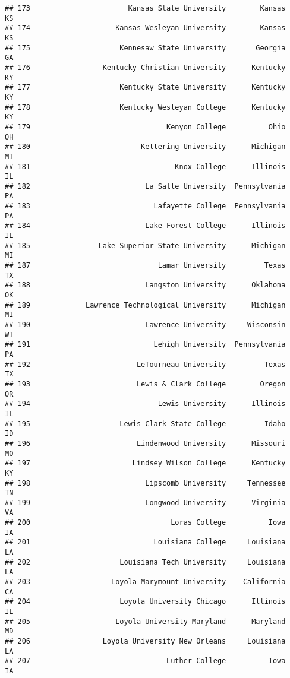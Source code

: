 \documentclass[
]{article}
\begin{document}
\begin{verbatim}
## 173                       Kansas State University        Kansas         KS
## 174                    Kansas Wesleyan University        Kansas         KS
## 175                     Kennesaw State University       Georgia         GA
## 176                 Kentucky Christian University      Kentucky         KY
## 177                     Kentucky State University      Kentucky         KY
## 178                     Kentucky Wesleyan College      Kentucky         KY
## 179                                Kenyon College          Ohio         OH
## 180                          Kettering University      Michigan         MI
## 181                                  Knox College      Illinois         IL
## 182                           La Salle University  Pennsylvania         PA
## 183                             Lafayette College  Pennsylvania         PA
## 184                           Lake Forest College      Illinois         IL
## 185                Lake Superior State University      Michigan         MI
## 187                              Lamar University         Texas         TX
## 188                           Langston University      Oklahoma         OK
## 189             Lawrence Technological University      Michigan         MI
## 190                           Lawrence University     Wisconsin         WI
## 191                             Lehigh University  Pennsylvania         PA
## 192                         LeTourneau University         Texas         TX
## 193                         Lewis & Clark College        Oregon         OR
## 194                              Lewis University      Illinois         IL
## 195                     Lewis-Clark State College         Idaho         ID
## 196                         Lindenwood University      Missouri         MO
## 197                        Lindsey Wilson College      Kentucky         KY
## 198                           Lipscomb University     Tennessee         TN
## 199                           Longwood University      Virginia         VA
## 200                                 Loras College          Iowa         IA
## 201                             Louisiana College     Louisiana         LA
## 202                     Louisiana Tech University     Louisiana         LA
## 203                   Loyola Marymount University    California         CA
## 204                     Loyola University Chicago      Illinois         IL
## 205                    Loyola University Maryland      Maryland         MD
## 206                 Loyola University New Orleans     Louisiana         LA
## 207                                Luther College          Iowa         IA

\end{verbatim}
\end{document}

